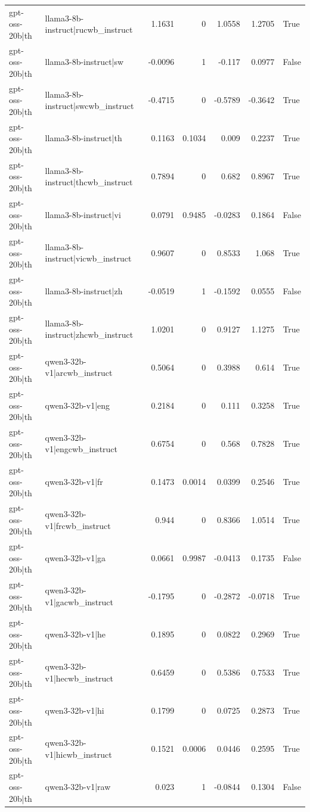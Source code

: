 \begin{table}
\begin{tabular}{l l r r r r l}
gpt-oss-20b|th & llama3-8b-instruct|rucwb_instruct & 1.1631 & 0 & 1.0558 & 1.2705 & True \\
gpt-oss-20b|th & llama3-8b-instruct|sw & -0.0096 & 1 & -0.117 & 0.0977 & False \\
gpt-oss-20b|th & llama3-8b-instruct|swcwb_instruct & -0.4715 & 0 & -0.5789 & -0.3642 & True \\
gpt-oss-20b|th & llama3-8b-instruct|th & 0.1163 & 0.1034 & 0.009 & 0.2237 & True \\
gpt-oss-20b|th & llama3-8b-instruct|thcwb_instruct & 0.7894 & 0 & 0.682 & 0.8967 & True \\
gpt-oss-20b|th & llama3-8b-instruct|vi & 0.0791 & 0.9485 & -0.0283 & 0.1864 & False \\
gpt-oss-20b|th & llama3-8b-instruct|vicwb_instruct & 0.9607 & 0 & 0.8533 & 1.068 & True \\
gpt-oss-20b|th & llama3-8b-instruct|zh & -0.0519 & 1 & -0.1592 & 0.0555 & False \\
gpt-oss-20b|th & llama3-8b-instruct|zhcwb_instruct & 1.0201 & 0 & 0.9127 & 1.1275 & True \\
gpt-oss-20b|th & qwen3-32b-v1|arcwb_instruct & 0.5064 & 0 & 0.3988 & 0.614 & True \\
gpt-oss-20b|th & qwen3-32b-v1|eng & 0.2184 & 0 & 0.111 & 0.3258 & True \\
gpt-oss-20b|th & qwen3-32b-v1|engcwb_instruct & 0.6754 & 0 & 0.568 & 0.7828 & True \\
gpt-oss-20b|th & qwen3-32b-v1|fr & 0.1473 & 0.0014 & 0.0399 & 0.2546 & True \\
gpt-oss-20b|th & qwen3-32b-v1|frcwb_instruct & 0.944 & 0 & 0.8366 & 1.0514 & True \\
gpt-oss-20b|th & qwen3-32b-v1|ga & 0.0661 & 0.9987 & -0.0413 & 0.1735 & False \\
gpt-oss-20b|th & qwen3-32b-v1|gacwb_instruct & -0.1795 & 0 & -0.2872 & -0.0718 & True \\
gpt-oss-20b|th & qwen3-32b-v1|he & 0.1895 & 0 & 0.0822 & 0.2969 & True \\
gpt-oss-20b|th & qwen3-32b-v1|hecwb_instruct & 0.6459 & 0 & 0.5386 & 0.7533 & True \\
gpt-oss-20b|th & qwen3-32b-v1|hi & 0.1799 & 0 & 0.0725 & 0.2873 & True \\
gpt-oss-20b|th & qwen3-32b-v1|hicwb_instruct & 0.1521 & 0.0006 & 0.0446 & 0.2595 & True \\
gpt-oss-20b|th & qwen3-32b-v1|raw & 0.023 & 1 & -0.0844 & 0.1304 & False \\

\end{tabular}
\end{table}
